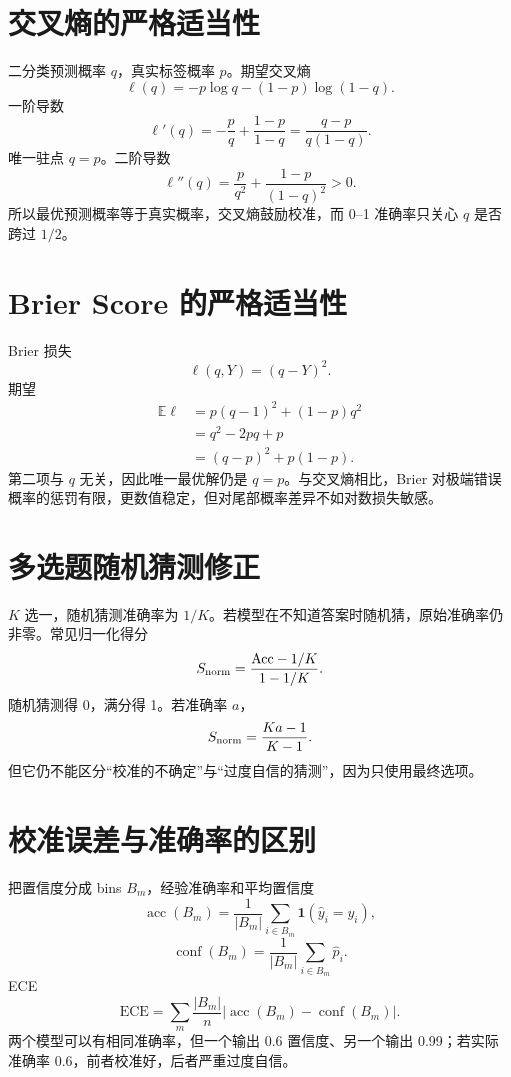 \documentclass[UTF8,12pt,a4paper,fontset=none]{ctexart}
\numberwithin{equation}{section}
\newcommand{\E}{\mathbb{E}}
\begin{document}
\section{交叉熵的严格适当性}
二分类预测概率 $q$，真实标签概率 $p$。期望交叉熵
\begin{equation}
 \ell(q)=-p\log q-(1-p)\log(1-q).
\end{equation}
一阶导数
\begin{equation}
 \ell'(q)=-\frac pq+\frac{1-p}{1-q}
 =\frac{q-p}{q(1-q)}.
\end{equation}
唯一驻点 $q=p$。二阶导数
\begin{equation}
 \ell''(q)=\frac p{q^2}+\frac{1-p}{(1-q)^2}>0.
\end{equation}
所以最优预测概率等于真实概率，交叉熵鼓励校准，而 0--1 准确率只关心 $q$ 是否跨过 $1/2$。

\section{Brier Score 的严格适当性}
Brier 损失
\begin{equation}
 \ell(q,Y)=(q-Y)^2.
\end{equation}
期望
\begin{align}
 \E\ell
 &=p(q-1)^2+(1-p)q^2\\
 &=q^2-2pq+p\\
 &=(q-p)^2+p(1-p).
\end{align}
第二项与 $q$ 无关，因此唯一最优解仍是 $q=p$。与交叉熵相比，Brier 对极端错误概率的惩罚有限，更数值稳定，但对尾部概率差异不如对数损失敏感。

\section{多选题随机猜测修正}
$K$ 选一，随机猜测准确率为 $1/K$。若模型在不知道答案时随机猜，原始准确率仍非零。常见归一化得分
\begin{equation}
 S_{\rm norm}=\frac{\mathrm{Acc}-1/K}{1-1/K}.
\end{equation}
随机猜测得 0，满分得 1。若准确率 $a$，
\begin{equation}
 S_{\rm norm}=\frac{Ka-1}{K-1}.
\end{equation}
但它仍不能区分“校准的不确定”与“过度自信的猜测”，因为只使用最终选项。

\section{校准误差与准确率的区别}
把置信度分成 bins $B_m$，经验准确率和平均置信度
\begin{equation}
 \operatorname{acc}(B_m)=\frac1{|B_m|}
 \sum_{i\in B_m}\mathbf 1(\hat y_i=y_i),
\end{equation}
\begin{equation}
 \operatorname{conf}(B_m)=\frac1{|B_m|}
 \sum_{i\in B_m}\hat p_i.
\end{equation}
ECE
\begin{equation}
 \mathrm{ECE}=\sum_m\frac{|B_m|}{n}
 |\operatorname{acc}(B_m)-\operatorname{conf}(B_m)|.
\end{equation}
两个模型可以有相同准确率，但一个输出 0.6 置信度、另一个输出 0.99；若实际准确率 0.6，前者校准好，后者严重过度自信。
\end{document}
